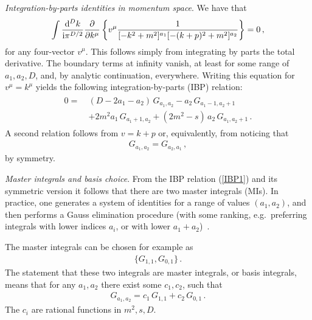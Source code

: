 \smallskip

 {\it Integration-by-parts identities in momentum space}.
We have that
\begin{align}
\int \frac{\mathrm{d}^{D}k}{\mathrm{i} \pi^{D/2}}  \frac{\partial}{\partial k^{\mu}} \left\{ v^\mu \frac{1}{[-k^2+m^2]^{a_1} [-(k+p)^2+m^2]^{a_2}} \right\} = 0\,,
\end{align}
for any four-vector $v^\mu$.
This follows simply from integrating by parts the total derivative. The boundary terms at infinity vanish, at least for some range of $a_1, a_2, D$, and, by analytic continuation, everywhere.
Writing this equation for $v^\mu=k^\mu$
yields the following integration-by-parts (IBP) relation:
\begin{align}\label{IBP1}
\begin{aligned}
0 = \ & (D-2 a_1 - a_2 ) \, G_{a_1 , a_2} - a_2 \, G_{a_1 - 1,a_2 + 1}  \\
 & +2 m^2 a_1 \, G_{a_1+1,a_2} + (2 m^2-s) \, a_2 \, G_{a_1, a_2 + 1} \,.
 \end{aligned}
\end{align}
A second relation follows from $v=k+p$ or, equivalently, from noticing that 
\begin{align}\label{IBPsymmetry}
G_{a_1, a_2} = G_{a_2, a_1}\,,
\end{align} 
by symmetry.

\smallskip

 {\it Master integrals and basis choice}.
 From the IBP relation (\ref{IBP1}) and its symmetric version it follows that there are two master integrals (MIs). 
In practice, one generates a system of identities for a range of values $(a_1, a_2)$, and then performs a Gauss elimination procedure (with some ranking, e.g.\ preferring integrals with lower indices $a_i$, or with lower $a_1+a_2$)~\cite{ch4Laporta:2000dsw}.

The master integrals can be chosen for example as
\begin{align}\label{choicemaster}
\{ G_{1,1} , G_{0,1} \} \,.
\end{align}
The statement that these two integrals are master integrals, or basis integrals, means that for any $a_1,a_2$ there exist some $c_1, c_2$, such that
\begin{align}
G_{a_1,a_2} = c_1 \, G_{1,1} + c_2 \, G_{0,1} \,.
\end{align}
The $c_i$ are rational functions in $m^2, s, D$.

